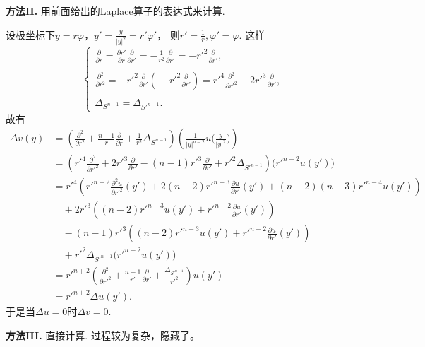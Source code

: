 \begin{itemize}
\textbf{方法II.} 用前面给出的Laplace算子的表达式来计算.

设极坐标下$y=r\varphi$，$y'=\frac{y}{|y|^2}=r'\varphi'$，
则$r'=\frac1r,\varphi'=\varphi$. 这样
$$\begin{cases}
    \displaystyle{\frac{\partial}{\partial r}
    =\frac{\partial r'}{\partial r}\frac{\partial}{\partial r'}
    =-\frac1{r^2}\frac{\partial}{\partial r'}
    =-r'^2\frac{\partial}{\partial r'},}\\ \\
    \displaystyle{\frac{\partial^2}{\partial r^2}
    =-r'^2\frac{\partial}{\partial r'}\left(\!-r'^2\frac{\partial}{\partial r'}\right)
    =r'^4\frac{\partial^2}{\partial r'^2}+2r'^3\frac{\partial}{\partial r'},}\\ \\
    \Delta_{S^{n-1}}=\Delta_{S'^{n-1}}.
\end{cases}$$
故有
\begin{align*}
\Delta v(y)
&=\left(\frac{\partial^2}{\partial r^2}+\frac{n-1}{r}\frac{\partial}{\partial r}+\frac{1}{r^2}\Delta_{S^{n-1}}\right)\left(\frac{1}{|y|^{n-2}}u\Big(\frac{y}{|y|^2}\Big)\right)\\
&=\left(r'^4\frac{\partial^2}{\partial r'^2}+2r'^3\frac{\partial}{\partial r'}
-(n-1)r'^3\frac{\partial}{\partial r'}+r'^2\Delta_{S'^{n-1}}\right)\big(r'^{n-2}u(y')\big)\\
&=r'^4\left(r'^{n-2}\frac{\partial^2u}{\partial r'^2}(y')+2(n-2)r'^{n-3}\frac{\partial u}{\partial r'}(y')+(n-2)(n-3)r'^{n-4}u(y')\right)\\
&\quad+2r'^3\left((n-2)r'^{n-3}u(y')+r'^{n-2}\frac{\partial u}{\partial r'}(y')\right)\\
&\quad-(n-1)r'^3\left((n-2)r'^{n-3}u(y')+r'^{n-2}\frac{\partial u}{\partial r'}(y')\right)\\
&\quad+r'^2\Delta_{S'^{n-1}}\big(r'^{n-2}u(y')\big)\\
&=r'^{n+2}\left(\frac{\partial^2}{\partial r'^2}+\frac{n-1}{r'}\frac{\partial}{\partial r'}+\frac{\Delta_{S'^{n-1}}}{r'^2}\right)u(y')\\
&=r'^{n+2}\Delta u(y').
\end{align*}
于是当$\Delta u=0$时$\Delta v=0$.


\begin{proofc}

\textbf{方法III.} 直接计算. 过程较为复杂，隐藏了。


\end{proofc}
\end{itemize}
